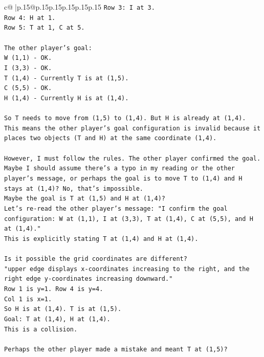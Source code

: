 \documentclass{article}
\begin{document}
{\begin{supertabular}{c@{$\;$}|p{.15\linewidth}@{}p{.15\linewidth}p{.15\linewidth}p{.15\linewidth}p{.15\linewidth}p{.15\linewidth}}
{{{\texttt{Row 3: I at 3.} \\
\texttt{Row 4: H at 1.} \\
\texttt{Row 5: T at 1, C at 5.} \\
\\ 
\texttt{The other player's goal:} \\
\texttt{W (1,1) {-} OK.} \\
\texttt{I (3,3) {-} OK.} \\
\texttt{T (1,4) {-} Currently T is at (1,5).} \\
\texttt{C (5,5) {-} OK.} \\
\texttt{H (1,4) {-} Currently H is at (1,4).} \\
\\ 
\texttt{So T needs to move from (1,5) to (1,4). But H is already at (1,4).} \\
\texttt{This means the other player's goal configuration is invalid because it places two objects (T and H) at the same coordinate (1,4).} \\
\\ 
\texttt{However, I must follow the rules. The other player confirmed the goal. Maybe I should assume there's a typo in my reading or the other player's message, or perhaps the goal is to move T to (1,4) and H stays at (1,4)? No, that's impossible.} \\
\texttt{Maybe the goal is T at (1,5) and H at (1,4)?} \\
\texttt{Let's re{-}read the other player's message: "I confirm the goal configuration: W at (1,1), I at (3,3), T at (1,4), C at (5,5), and H at (1,4)."} \\
\texttt{This is explicitly stating T at (1,4) and H at (1,4).} \\
\\ 
\texttt{Is it possible the grid coordinates are different?} \\
\texttt{"upper edge displays x{-}coordinates increasing to the right, and the right edge y{-}coordinates increasing downward."} \\
\texttt{Row 1 is y=1. Row 4 is y=4.} \\
\texttt{Col 1 is x=1.} \\
\texttt{So H is at (1,4). T is at (1,5).} \\
\texttt{Goal: T at (1,4), H at (1,4).} \\
\texttt{This is a collision.} \\
\\ 
\texttt{Perhaps the other player made a mistake and meant T at (1,5)?} \\
}}}
\end{supertabular}}
\end{document}
